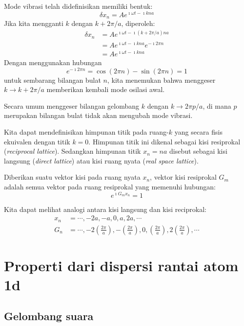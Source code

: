 Mode vibrasi telah didefinisikan memiliki bentuk:
\begin{equation}
\delta x_{n} = A e^{\imath \omega t - \imath k n a}
\end{equation}
Jika kita mengganti $k$ dengan $k + 2\pi/a$, diperoleh:
\begin{align}
\delta x_{n} & = A e^{\imath \omega t - \imath (k + 2\pi/a) n a} \\
& = A e^{\imath \omega t - \imath k n a} e^{-\imath 2\pi n} \\
& = A e^{\imath \omega t - \imath k n a}
\end{align}
Dengan menggunakan hubungan
$$
e^{-\imath 2\pi n } = \cos(2\pi n) - \sin(2\pi n) = 1
$$
untuk sembarang bilangan bulat $n$, kita menemukan bahwa
menggeser $k \rightarrow k + 2\pi/a$ memberikan
kembali mode osilasi awal.

Secara umum menggeser bilangan gelombang $k$ dengan
$k \rightarrow 2\pi p/a$, di mana $p$ merupakan bilangan bulat
tidak akan mengubah mode vibrasi.

Kita dapat mendefinisikan himpunan titik pada ruang-$k$ yang secara
fisis ekuivalen dengan titik $k=0$. Himpunan titik ini dikenal sebagai
kisi resiprokal (\emph{reciprocal lattice}).
Sedangkan himpunan titik $x_{n} = na$ disebut sebagai kisi langsung
(\emph{direct lattice}) atau kisi ruang nyata (\emph{real space
lattice}).

Diberikan suatu vektor kisi pada ruang nyata $x_{n}$, vektor kisi resiprokal
$G_{m}$ adalah semua vektor pada ruang resiprokal yang memenuhi hubungan:
\begin{equation}
e^{\imath G_{m} x_{n}} = 1
\end{equation}

Kita dapat melihat analogi antara kisi langsung dan kisi reciprokal:
\begin{align*}
x_{n} & = \cdots, -2a, -a, 0, a, 2a, \cdots \\
G_{n} & = \cdots, -2\left(\frac{2\pi}{a}\right), -\left(\frac{2\pi}{a}\right), 0, \left(\frac{2\pi}{a}\right), 2\left(\frac{2\pi}{a}\right), \cdots
\end{align*}

\section{Properti dari dispersi rantai atom 1d}

\subsection{Gelombang suara}

